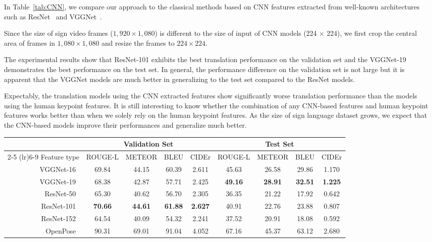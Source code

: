 \documentclass[10pt,twocolumn,letterpaper]{article}
\begin{document}
In Table~\ref{tab:CNN}, we compare our approach to the classical methods
based on CNN features extracted from well-known architectures such as
ResNet~\cite{HeZRS16} and VGGNet~\cite{SimonyanZ14a}.

Since the size of sign video frames ($1,920 \times 1,080$) is different to the size of input of CNN models (224 $\times$ 224), we first crop the central area of frames in $1,080 \times 1,080$ and resize the frames to $224 \times 224$.

The experimental results show that ResNet-101 exhibits the best translation performance on the validation set and the VGGNet-19 demonstrates the best performance on the test set. In general, the performance difference on the validation set is not large but it is apparent that the VGGNet models are much better in generalizing to the test set compared to the ResNet models.

Expectably, the translation models using the CNN extracted features show significantly worse translation performance than the models using the human keypoint features. It is still interesting to know whether the combination of any CNN-based features and human keypoint features works better than when we solely rely on the human keypoint features. As the size of sign language dataset grows, we expect that the CNN-based models improve their performances and generalize much better.
\\

\begin{table*}[ht]
\centering
\begin{tabular}{@{ }rcccccccc@{ }}
\toprule
& \multicolumn{4}{c}{Validation Set} & \multicolumn{4}{c}{Test Set} \\
\cmidrule(lr){2-5} \cmidrule(lr){6-9}
Feature type    &   ROUGE-L & METEOR  & BLEU  & CIDEr &  ROUGE-L & METEOR  & BLEU & CIDEr\\
\midrule
VGGNet-16~\cite{SimonyanZ14a}  &  69.84 & 44.15 & 60.39 & 2.611 & 45.63 & 26.58 & 29.86 & 1.170\\
VGGNet-19~\cite{SimonyanZ14a}  &  68.38 & 42.87 & 57.71 & 2.425 & {\bf 49.16} & {\bf 28.91} & {\bf 32.51} & {\bf 1.225}\\
ResNet-50~\cite{HeZRS16}  & 65.30 & 40.62 & 56.70 & 2.305 & 36.35 & 21.22 & 17.92 & 0.642\\
ResNet-101~\cite{HeZRS16} & {\bf 70.66} & {\bf 44.61} & {\bf 61.88} & {\bf 2.627} & 40.91 & 22.76 & 23.88 & 0.807\\
ResNet-152~\cite{HeZRS16} & 64.54 & 40.09 & 54.32 & 2.241 & 37.52 & 20.91 & 18.08 & 0.592\\
\midrule
OpenPose~\cite{CaoSWS17,SimonJMS17,WeiRKS16} & 90.31 & 69.01 & 91.04 & 4.052 & 67.16 & 45.37 & 63.12 & 2.680\\
\bottomrule
\end{tabular}
\caption{Performance comparison with translation models based on CNN-based feature extraction techniques. Note that the augmentation factor in this experiment is all set to 50.}
\label{tab:CNN}
\end{table*}
\end{document}

